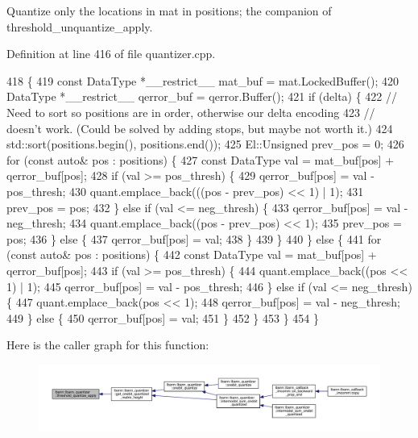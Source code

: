 Quantize only the locations in mat in positions; the companion of threshold\+\_\+unquantize\+\_\+apply. 

Definition at line 416 of file quantizer.\+cpp.


\begin{DoxyCode}
418                                                                      \{
419   \textcolor{keyword}{const} DataType *\_\_restrict\_\_ mat\_buf = mat.LockedBuffer();
420   DataType *\_\_restrict\_\_ qerror\_buf = qerror.Buffer();
421   \textcolor{keywordflow}{if} (delta) \{
422     \textcolor{comment}{// Need to sort so positions are in order, otherwise our delta encoding}
423     \textcolor{comment}{// doesn't work. (Could be solved by adding stops, but maybe not worth it.)}
424     std::sort(positions.begin(), positions.end());
425     El::Unsigned prev\_pos = 0;
426     \textcolor{keywordflow}{for} (\textcolor{keyword}{const} \textcolor{keyword}{auto}& pos : positions) \{
427       \textcolor{keyword}{const} DataType val = mat\_buf[pos] + qerror\_buf[pos];
428       \textcolor{keywordflow}{if} (val >= pos\_thresh) \{
429         qerror\_buf[pos] = val - pos\_thresh;
430         quant.emplace\_back(((pos - prev\_pos) << 1) | 1);
431         prev\_pos = pos;
432       \} \textcolor{keywordflow}{else} \textcolor{keywordflow}{if} (val <= neg\_thresh) \{
433         qerror\_buf[pos] = val - neg\_thresh;
434         quant.emplace\_back((pos - prev\_pos) << 1);
435         prev\_pos = pos;
436       \} \textcolor{keywordflow}{else} \{
437         qerror\_buf[pos] = val;
438       \}
439     \}
440   \} \textcolor{keywordflow}{else} \{
441     \textcolor{keywordflow}{for} (\textcolor{keyword}{const} \textcolor{keyword}{auto}& pos : positions) \{
442       \textcolor{keyword}{const} DataType val = mat\_buf[pos] + qerror\_buf[pos];
443       \textcolor{keywordflow}{if} (val >= pos\_thresh) \{
444         quant.emplace\_back((pos << 1) | 1);
445         qerror\_buf[pos] = val - pos\_thresh;
446       \} \textcolor{keywordflow}{else} \textcolor{keywordflow}{if} (val <= neg\_thresh) \{
447         quant.emplace\_back(pos << 1);
448         qerror\_buf[pos] = val - neg\_thresh;
449       \} \textcolor{keywordflow}{else} \{
450         qerror\_buf[pos] = val;
451       \}
452     \}
453   \}
454 \}
\end{DoxyCode}
Here is the caller graph for this function\+:\nopagebreak
\begin{figure}[H]
\begin{center}
\leavevmode
\includegraphics[width=350pt]{classlbann_1_1lbann__quantizer_a2bcdf31781bf72bbe63940ea0d92990f_icgraph}
\end{center}
\end{figure}
